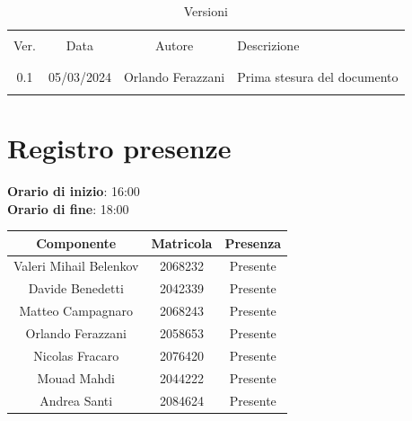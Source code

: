 \documentclass[italian, 12pt]{article}
\begin{document}
\pagestyle{mystyle}


\begin{table}[!h]
	\caption{Versioni}
	\begin{center}
		\begin{tabular}{ c c c p{9cm}}
			\hline \\[-2ex]
			Ver. & Data & Autore & Descrizione \\
			\\[-2ex] \hline \\[-1.5ex]
			0.1 & 05/03/2024 & Orlando Ferazzani& Prima stesura del documento\\
			\\[-1.5ex] \hline
		\end{tabular}
	\end{center}
\end{table}


\tableofcontents
\newpage


\section{Registro presenze}

\textbf{Orario di inizio}: 16:00\\
\textbf{Orario di fine}: 18:00\\


\begin{flushleft}
	\begin{table}[!h]
	\begin{tabular}{ |c|c|c| } 
		\hline
		\textbf{Componente} & \textbf{Matricola} & \textbf{Presenza} \\
  \hline 
		Valeri Mihail Belenkov & 2068232 & Presente \\ 
		Davide Benedetti 	& 2042339 & Presente \\
		Matteo Campagnaro	& 2068243 & Presente \\
		Orlando Ferazzani 	& 2058653 & Presente \\
		Nicolas Fracaro 	& 2076420 & Presente \\
		Mouad Mahdi		    & 2044222 & Presente \\ 
		Andrea Santi 	    & 2084624 & Presente \\
		\hline
	\end{tabular}
	\end{table}
	\end{flushleft}
\end{document}
